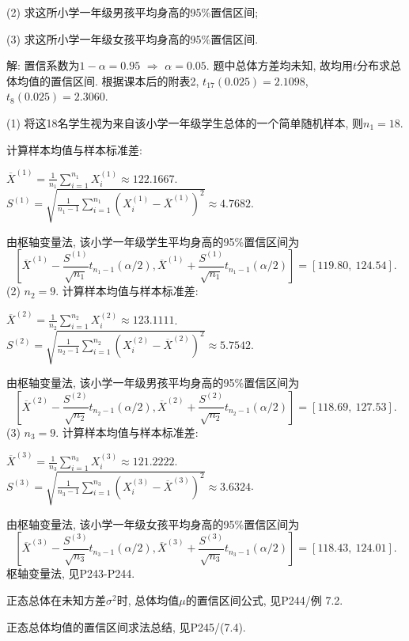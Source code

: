 \documentclass[standard]{ExBook}
\renewenvironment{shaded}{%
  \def\FrameCommand{\fboxsep=\FrameSep \colorbox{shadecolor}}%
  \MakeFramed{\advance\hsize-\width \FrameRestore}%
}{%
  \endMakeFramed
}
\begin{document}
\begin{qitems}
\begin{bbox}
\begin{shaded}
(2) 求这所小学一年级男孩平均身高的95\%置信区间;

(3) 求这所小学一年级女孩平均身高的95\%置信区间.
    \end{shaded}
    \end{bbox}

\vspace{\dimexpr2.5cm-5em\relax}

解: 置信系数为$1-\alpha=0.95$ $\Longrightarrow$ $\alpha=0.05$. 题中总体方差均未知, 故均用$t$分布求总体均值的置信区间. 根据课本后的附表2,
$
t_{17}(0.025)=2.1098
$,
$
t_8(0.025)=2.3060.
$

(1) 将这18名学生视为来自该小学一年级学生总体的一个简单随机样本, 则$n_1=18$.

计算样本均值与样本标准差:

$\overline{X}^{(1)}=\frac{1}{n_1}\sum_{i=1}^{n_1}X_i^{(1)}\approx122.1667$. 
$S^{(1)}=\sqrt{\frac{1}{n_1-1}\sum_{i=1}^{n_1}(X_i^{(1)}-\overline{X}^{(1)})^2}\approx4.7682$.

由枢轴变量法, 该小学一年级学生平均身高的95\%置信区间为
$$
\left[
\overline{X}^{(1)}-\frac{S^{(1)}}{\sqrt{n_1}}t_{n_1-1}(\alpha/2),
\overline{X}^{(1)}+\frac{S^{(1)}}{\sqrt{n_1}}t_{n_1-1}(\alpha/2)
\right]
=
[119.80,\ 124.54].
$$
(2) $n_2=9$. 计算样本均值与样本标准差:

$\overline{X}^{(2)}=\frac{1}{n_2}\sum_{i=1}^{n_2}X_i^{(2)}\approx123.1111$. 
$S^{(2)}=\sqrt{\frac{1}{n_2-1}\sum_{i=1}^{n_2}(X_i^{(2)}-\overline{X}^{(2)})^2}\approx5.7542$.

由枢轴变量法, 该小学一年级男孩平均身高的95\%置信区间为
$$
\left[
\overline{X}^{(2)}-\frac{S^{(2)}}{\sqrt{n_2}}t_{n_2-1}(\alpha/2),
\overline{X}^{(2)}+\frac{S^{(2)}}{\sqrt{n_2}}t_{n_2-1}(\alpha/2)
\right]
=
[118.69,\ 127.53].
$$
(3) $n_3=9$. 计算样本均值与样本标准差:

$\overline{X}^{(3)}=\frac{1}{n_3}\sum_{i=1}^{n_3}X_i^{(3)}\approx121.2222$. 
$S^{(3)}=\sqrt{\frac{1}{n_3-1}\sum_{i=1}^{n_3}(X_i^{(3)}-\overline{X}^{(3)})^2}\approx3.6324$.

由枢轴变量法, 该小学一年级女孩平均身高的95\%置信区间为
$$
\left[
\overline{X}^{(3)}-\frac{S^{(3)}}{\sqrt{n_3}}t_{n_3-1}(\alpha/2),
\overline{X}^{(3)}+\frac{S^{(3)}}{\sqrt{n_3}}t_{n_3-1}(\alpha/2)
\right]
=
[118.43,\ 124.01].
$$
\textcolor{themeColor}{\selectfont {} 枢轴变量法, 见P243-P244.}

\textcolor{themeColor}{\selectfont {} 
正态总体在未知方差$\sigma^2$时, 总体均值$\mu$的置信区间公式, 见P244/例 7.2.}

\textcolor{themeColor}{\selectfont {} 正态总体均值的置信区间求法总结, 见P245/(7.4).}


\end{qitems}
\end{document}
